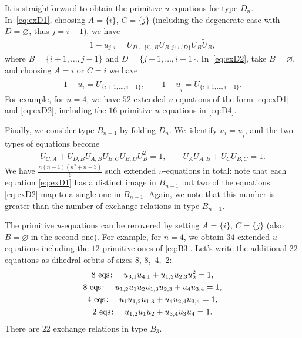 \documentclass[10pt,a4paper]{amsart}
\numberwithin{equation}{section}
\begin{document}
It is straightforward to obtain the primitive $u$-equations for type $D_n$. In~\eqref{eq:exD1}, choosing $A=\{i\}$, $C=\{j\}$ (including the degenerate case with $D=\varnothing$, thus $j=i{-}1$), we have
\begin{gather*}
1-u_{j,i}=U_{D\cup \{i\}, B} U_{B, j\cup \{D\}} U_B \tilde {U}_B,
\end{gather*}
where $B=\{i{+}1, \dots, j{-}1\}$ and $D=\{j{+}1, \dots, i{-}1\}$. In~\eqref{eq:exD2}, take $B=\varnothing$, and choosing $A=i$ or $C=i$ we have
\begin{gather*}
1-u_i=\tilde{U}_{\{i{+}1, \dots, i{-}1\}},\qquad
1-{u}_{\tilde i}=U_{\{i{+}1, \dots, i{-}1\}}.
\end{gather*}
For example, for $n=4$, we have $52$ extended $u$-equations of the form \eqref{eq:exD1} and \eqref{eq:exD2}, including the $16$ primitive $u$-equations in \eqref{eq:D4}.

\medskip{}
Finally, we consider type $B_{n{-}1}$ by folding $D_n$. We~identify $u_i=u_{\tilde i}$, and the two types of equations become
\begin{gather*}%
U_{C,A}+U_{D,B} U_{A,B} U_{B,C} U_{B,D} U_B^2=1, \qquad
U_A U_{A,B}+U_C U_{B,C}=1.
\end{gather*}
We have $\frac{n(n{-}1)(n^2+n-3)}{6}$ such extended $u$-equations in total: note that each equation \eqref{eq:exD1} has a distinct image in $B_{n{-}1}$ but two of the equations \eqref{eq:exD2} map to a single one in $B_{n{-}1}$. Again, we note that this number is greater than the number of exchange relations in type $B_{n{-}1}$.

The primitive $u$-equations can be recovered by setting $A=\{i\}$, $C=\{j\}$ (also $B=\varnothing$ in the second one). For example, for $n=4$, we obtain $34$ extended $u$-equations including the $12$ primitive ones of \eqref{eq:B3}. Let's write the additional $22$ equations as dihedral orbits of sizes 8, 8,~4,~2:
\begin{gather*}
8~{\rm eqs}\colon \quad u_{3,1} u_{4,1}+u_{1,2} u_{2,3} u_2^2=1,%
\\
8~{\rm eqs}\colon \quad u_{1,2} u_1 u_2 u_{1,3} u_{2,3}+u_4 u_{3,4}=1,%
\\
4~{\rm eqs}\colon \quad u_1 u_{1,2} u_{1,3}+ u_4 u_{2,4} u_{3,4}=1,%
\\
2~{\rm eqs}\colon \quad u_{1,2} u_1 u_2+u_{3,4} u_3 u_4=1.%
\end{gather*}
There are $22$ exchange relations in type $B_3$.
\end{document}

